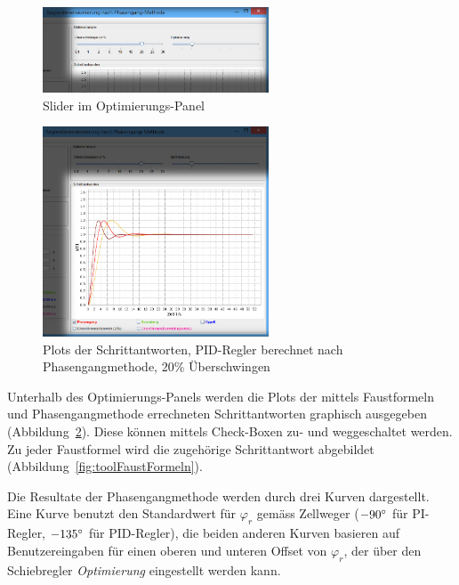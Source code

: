 \begin{figure}[h!, width=\pagewidth]
    \centering
    \includegraphics[width=0.6\textwidth]{images/tool20UeberschwingenPIDOptimierungen.jpg}
    \caption{Slider im Optimierungs-Panel}
    \label{fig:optimierungen}
\end{figure}

\begin{figure}[h!, width=\pagewidth]
    \centering
    \includegraphics[width=0.6\textwidth]{images/tool20UeberschwingenPIDPlots.jpg}
    \caption{Plots der Schrittantworten, PID-Regler berechnet nach Phasengangmethode, 20\% \"Uberschwingen}
    \label{fig:tool20Plots}
\end{figure}

Unterhalb   des    Optimierungs-Panels   werden   die   Plots    der   mittels
Faustformeln     und     Phasengangmethode    errechneten     Schrittantworten
graphisch    ausgegeben   (Abbildung~\ref{fig:tool20Plots}). Diese    k\"onnen
mittels    Check-Boxen     zu-    und    weggeschaltet     werden. Zu    jeder
Faustformel     wird     die    zugeh\"orige     Schrittantwort     abgebildet
(Abbildung~\ref{fig:toolFaustFormeln}).

Die Resultate der Phasengangmethode werden durch drei Kurven dargestellt. Eine
Kurve   benutzt  den   Standardwert  f\"ur   $\varphi_r$  gem\"ass   Zellweger
($-90\degree$  f\"ur PI-Regler,  $-135\degree$ f\"ur  PID-Regler), die  beiden
anderen Kurven  basieren auf Benutzereingaben  f\"ur einen oberen  und unteren
Offset  von  $\varphi_r$,  der   \"uber  den  Schiebregler  \emph{Optimierung}
eingestellt werden kann.

